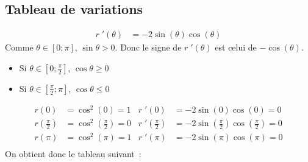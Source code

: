 \documentclass{article}
\begin{document}
\subsection{Tableau de variations}
\begin{align*}
        r\; '(\theta) & = -2\sin(\theta)\cos(\theta)
\end{align*}
Comme $\theta\in\left[0;\pi\right]$, $\sin \theta>0$.
Donc le signe de $r\; '(\theta)$ est celui de $-\cos(\theta)$.
\begin{itemize}
        \item Si $\theta\in\left[0;\frac{\pi}{2}\right]$, $\cos \theta\ge 0$
        \item Si $\theta\in\left[\frac{\pi}{2};\pi\right]$, $\cos \theta\le 0$
\end{itemize}
\begin{align*}
        r(0)     & = \cos^2(0) = 1 &
        r\; '(0) & = -2\sin(0)\cos(0) = 0 \\
        r(\frac{\pi}{2})     & = \cos^2(\frac{\pi}{2}) = 0 &
        r\; '(\frac{\pi}{2}) & = -2\sin(\frac{\pi}{2})\cos(\frac{\pi}{2}) = 0 \\
        r(\pi)     & = \cos^2(\pi) = 1 &
        r\; '(\pi) & = -2\sin(\pi)\cos(\pi) = 0 \\
\end{align*}
On obtient donc le tableau suivant~:\\
\end{document}
